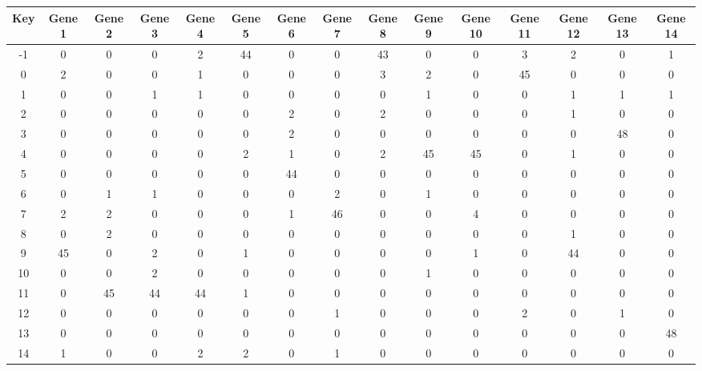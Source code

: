 \begin{tabular}{|c|c|c|c|c|c|c|c|c|c|c|c|c|c|c|}
\hline
Key & Gene 1 & Gene 2 & Gene 3 & Gene 4 & Gene 5 & Gene 6 & Gene 7 & Gene 8 & Gene 9 & Gene 10 & Gene 11 & Gene 12 & Gene 13 & Gene 14 \\
\hline
-1 & 0 & 0 & 0 & 2 & 44 & 0 & 0 & 43 & 0 & 0 & 3 & 2 & 0 & 1 \\
0 & 2 & 0 & 0 & 1 & 0 & 0 & 0 & 3 & 2 & 0 & 45 & 0 & 0 & 0 \\
1 & 0 & 0 & 1 & 1 & 0 & 0 & 0 & 0 & 1 & 0 & 0 & 1 & 1 & 1 \\
2 & 0 & 0 & 0 & 0 & 0 & 2 & 0 & 2 & 0 & 0 & 0 & 1 & 0 & 0 \\
3 & 0 & 0 & 0 & 0 & 0 & 2 & 0 & 0 & 0 & 0 & 0 & 0 & 48 & 0 \\
4 & 0 & 0 & 0 & 0 & 2 & 1 & 0 & 2 & 45 & 45 & 0 & 1 & 0 & 0 \\
5 & 0 & 0 & 0 & 0 & 0 & 44 & 0 & 0 & 0 & 0 & 0 & 0 & 0 & 0 \\
6 & 0 & 1 & 1 & 0 & 0 & 0 & 2 & 0 & 1 & 0 & 0 & 0 & 0 & 0 \\
7 & 2 & 2 & 0 & 0 & 0 & 1 & 46 & 0 & 0 & 4 & 0 & 0 & 0 & 0 \\
8 & 0 & 2 & 0 & 0 & 0 & 0 & 0 & 0 & 0 & 0 & 0 & 1 & 0 & 0 \\
9 & 45 & 0 & 2 & 0 & 1 & 0 & 0 & 0 & 0 & 1 & 0 & 44 & 0 & 0 \\
10 & 0 & 0 & 2 & 0 & 0 & 0 & 0 & 0 & 1 & 0 & 0 & 0 & 0 & 0 \\
11 & 0 & 45 & 44 & 44 & 1 & 0 & 0 & 0 & 0 & 0 & 0 & 0 & 0 & 0 \\
12 & 0 & 0 & 0 & 0 & 0 & 0 & 1 & 0 & 0 & 0 & 2 & 0 & 1 & 0 \\
13 & 0 & 0 & 0 & 0 & 0 & 0 & 0 & 0 & 0 & 0 & 0 & 0 & 0 & 48 \\
14 & 1 & 0 & 0 & 2 & 2 & 0 & 1 & 0 & 0 & 0 & 0 & 0 & 0 & 0 \\
\hline
\end{tabular}